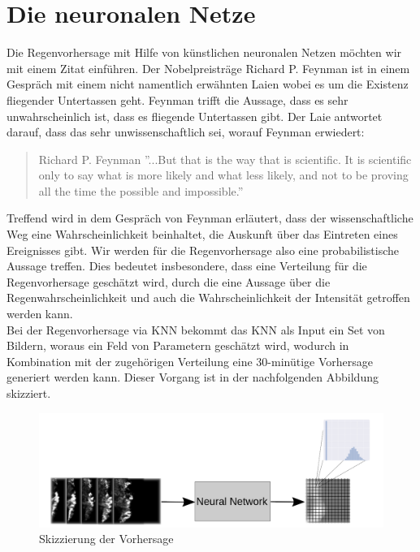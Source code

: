 \newpage

\section{Die neuronalen Netze}\label{die neuronalen netze}

Die Regenvorhersage mit Hilfe von künstlichen neuronalen Netzen möchten wir mit einem Zitat einführen.
Der Nobelpreisträge Richard P. Feynman ist in einem Gespräch mit einem nicht namentlich erwähnten Laien wobei es um die Existenz fliegender Untertassen geht. Feynman trifft die Aussage, dass es sehr unwahrscheinlich ist, dass es fliegende Untertassen gibt. Der Laie antwortet darauf, dass das sehr unwissenschaftlich sei, worauf Feynman erwiedert:

\begin{quote}{Richard P. Feynman}
''...But that is the way that is scientific. It is scientific only to say what is more likely and what less likely, and not to be proving all the time the possible and impossible.''  
\end{quote}

\noindent Treffend wird in dem Gespräch von Feynman erläutert, dass der wissenschaftliche Weg eine Wahrscheinlichkeit beinhaltet, die Auskunft über das Eintreten eines Ereignisses gibt. Wir werden für die Regenvorhersage also eine probabilistische Aussage treffen. Dies bedeutet insbesondere, dass eine Verteilung für die Regenvorhersage geschätzt wird, durch die eine Aussage über die Regenwahrscheinlichkeit und auch die Wahrscheinlichkeit der Intensität getroffen werden kann.\\

\noindent Bei der Regenvorhersage via KNN bekommt das KNN als Input ein Set von Bildern, woraus ein Feld von Parametern geschätzt wird, wodurch in Kombination mit der zugehörigen Verteilung eine 30-minütige Vorhersage generiert werden kann. Dieser Vorgang ist in der nachfolgenden Abbildung skizziert.


\begin{figure}[htb]
 \centering
 \includegraphics[width=1.0\textwidth,angle=0]{abb/skizzierung_regenvorhersage}
 \caption{Skizzierung der Vorhersage}
\label{fig:Vorhersage_skizze}
\end{figure}

